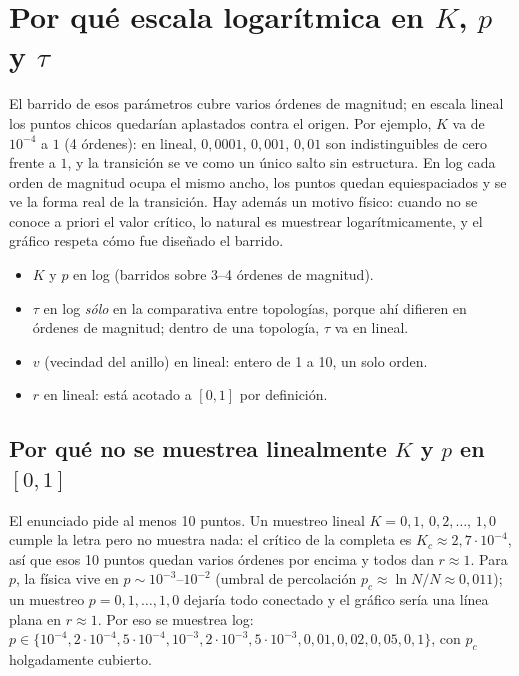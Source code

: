 \documentclass[11pt,a4paper]{article}
\begin{document}
\section{Por qué escala logarítmica en $K$, $p$ y $\tau$}

El barrido de esos parámetros cubre varios órdenes de magnitud; en escala lineal
los puntos chicos quedarían aplastados contra el origen. Por ejemplo, $K$ va de
$10^{-4}$ a $1$ (4 órdenes): en lineal, $0{,}0001$, $0{,}001$, $0{,}01$ son
indistinguibles de cero frente a $1$, y la transición se ve como un único salto
sin estructura. En log cada orden de magnitud ocupa el mismo ancho, los puntos
quedan equiespaciados y se ve la forma real de la transición. Hay además un
motivo físico: cuando no se conoce a priori el valor crítico, lo natural es
muestrear logarítmicamente, y el gráfico respeta cómo fue diseñado el barrido.

\begin{itemize}
  \item $K$ y $p$ en log (barridos sobre 3--4 órdenes de magnitud).
  \item $\tau$ en log \emph{sólo} en la comparativa entre topologías, porque ahí
  difieren en órdenes de magnitud; dentro de una topología, $\tau$ va en lineal.
  \item $v$ (vecindad del anillo) en lineal: entero de 1 a 10, un solo orden.
  \item $r$ en lineal: está acotado a $[0, 1]$ por definición.
\end{itemize}

\subsection*{Por qué no se muestrea linealmente $K$ y $p$ en $[0,1]$}

El enunciado pide al menos 10 puntos. Un muestreo lineal $K = 0{,}1,\,0{,}2,
\ldots,\,1{,}0$ cumple la letra pero no muestra nada: el crítico de la completa
es $K_c \approx 2{,}7\cdot 10^{-4}$, así que esos 10 puntos quedan varios órdenes
por encima y todos dan $r \approx 1$. Para $p$, la física vive en
$p \sim 10^{-3}$--$10^{-2}$ (umbral de percolación $p_c \approx \ln N / N \approx
0{,}011$); un muestreo $p = 0{,}1, \ldots, 1{,}0$ dejaría todo conectado y el
gráfico sería una línea plana en $r \approx 1$. Por eso se muestrea log:
$p \in \{10^{-4}, 2\!\cdot\!10^{-4}, 5\!\cdot\!10^{-4}, 10^{-3}, 2\!\cdot\!10^{-3},
5\!\cdot\!10^{-3}, 0{,}01, 0{,}02, 0{,}05, 0{,}1\}$, con $p_c$ holgadamente
cubierto.
\end{document}
